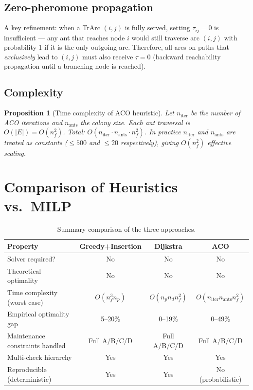 \documentclass[11pt, a4paper]{article}
\theoremstyle{plain}
\newtheorem{proposition}{Proposition}
\theoremstyle{definition}
\theoremstyle{remark}
\begin{document}
\subsection{Zero-pheromone propagation}

A key refinement: when a TrArc $(i,j)$ is fully served, setting
$\tau_{ij} = 0$ is insufficient — any ant that reaches node $i$ would still
traverse arc $(i,j)$ with probability 1 if it is the only outgoing arc.
Therefore, all arcs on paths that \emph{exclusively} lead to $(i,j)$ must
also receive $\tau = 0$ (backward reachability propagation until a branching
node is reached).

\subsection{Complexity}

\begin{proposition}[Time complexity of ACO heuristic]
  Let $n_{\mathrm{iter}}$ be the number of ACO iterations and $n_{\mathrm{ants}}$ the
  colony size.  Each ant traversal is $O(|E|) = O(n_f^2)$.  Total:
  $O(n_{\mathrm{iter}} \cdot n_{\mathrm{ants}} \cdot n_f^2)$.  In practice
  $n_{\mathrm{iter}}$ and $n_{\mathrm{ants}}$ are treated as constants
  ($\le 500$ and $\le 20$ respectively), giving $O(n_f^2)$ effective scaling.
\end{proposition}

\section{Comparison of Heuristics vs.\ MILP}

\begin{table}[h]
\centering
\caption{Summary comparison of the three approaches.}
\begin{tabular}{lccc}
\toprule
Property & Greedy+Insertion & Dijkstra & ACO \\
\midrule
Solver required? & No  & No  & No \\
Theoretical optimality & No & No & No \\
Time complexity (worst case) & $O(n_f^3 n_p)$ & $O(n_p n_d n_f^2)$ & $O(n_{\mathrm{iter}} n_{\mathrm{ants}} n_f^2)$ \\
Empirical optimality gap & 5--20\% & 0--19\% & 0--49\% \\
Maintenance constraints handled & Full A/B/C/D & Full A/B/C/D & Full A/B/C/D \\
Multi-check hierarchy & Yes & Yes & Yes \\
Reproducible (deterministic) & Yes & Yes & No (probabilistic) \\
\bottomrule
\end{tabular}
\end{table}
\end{document}
